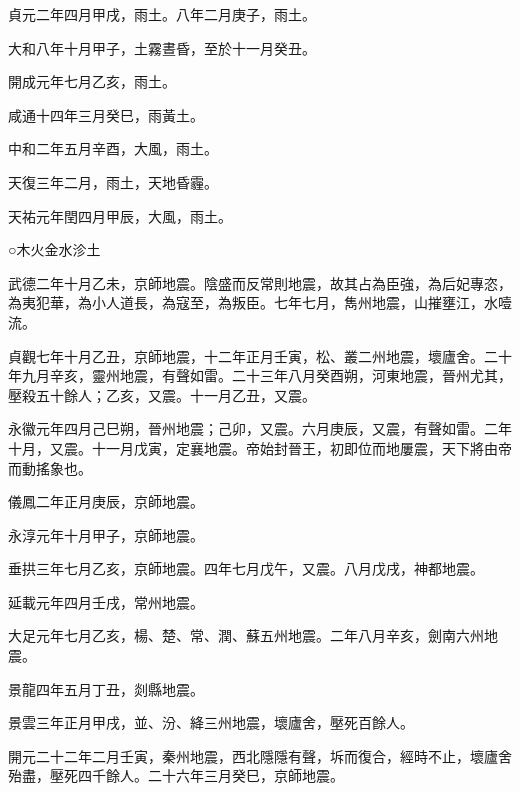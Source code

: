 \begin{pinyinscope}
 貞元二年四月甲戌，雨土。八年二月庚子，雨土。



 大和八年十月甲子，土霧晝昏，至於十一月癸丑。



 開成元年七月乙亥，雨土。



 咸通十四年三月癸巳，雨黃土。



 中和二年五月辛酉，大風，雨土。



 天復三年二月，雨土，天地昏霾。



 天祐元年閏四月甲辰，大風，雨土。



 ○木火金水沴土



 武德二年十月乙未，京師地震。陰盛而反常則地震，故其占為臣強，為后妃專恣，為夷犯華，為小人道長，為寇至，為叛臣。七年七月，雋州地震，山摧壅江，水噎流。



 貞觀七年十月乙丑，京師地震，十二年正月壬寅，松、叢二州地震，壞廬舍。二十年九月辛亥，靈州地震，有聲如雷。二十三年八月癸酉朔，河東地震，晉州尤其，壓殺五十餘人；乙亥，又震。十一月乙丑，又震。



 永徽元年四月己巳朔，晉州地震；己卯，又震。六月庚辰，又震，有聲如雷。二年十月，又震。十一月戊寅，定襄地震。帝始封晉王，初即位而地屢震，天下將由帝而動搖象也。



 儀鳳二年正月庚辰，京師地震。



 永淳元年十月甲子，京師地震。



 垂拱三年七月乙亥，京師地震。四年七月戊午，又震。八月戊戌，神都地震。



 延載元年四月壬戌，常州地震。



 大足元年七月乙亥，楊、楚、常、潤、蘇五州地震。二年八月辛亥，劍南六州地震。



 景龍四年五月丁丑，剡縣地震。



 景雲三年正月甲戌，並、汾、絳三州地震，壞廬舍，壓死百餘人。



 開元二十二年二月壬寅，秦州地震，西北隱隱有聲，坼而復合，經時不止，壞廬舍殆盡，壓死四千餘人。二十六年三月癸巳，京師地震。




\end{pinyinscope}
